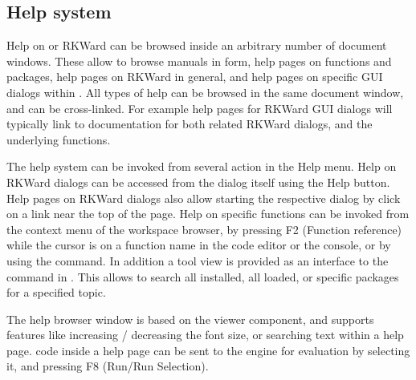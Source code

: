 \subsection{Help system}
\label{sec:help_system}
Help on 
or RKWard can be browsed inside an arbitrary number of document
windows. These allow to browse  manuals in
 form, help pages on
 functions and packages, help pages on
RKWard in general, and help pages on specific GUI dialogs within
. All types of help can be browsed in the
same document window, and can be cross-linked. For example help pages for
RKWard GUI dialogs will typically link to documentation for both
related RKWard dialogs, and the underlying
 functions.

The help system can be invoked from several action in the
Help menu. Help on RKWard dialogs can be
accessed from the dialog itself using the
Help button. Help pages on RKWard dialogs
also allow starting the respective dialog by click on a link near the
top of the page. Help on  specific
 functions can be invoked from the context
menu of the workspace browser, by pressing F2 (Function
reference) while the cursor is on a function name in the
code editor or the  console, or by using
the  
command. In addition a tool view is provided as an interface to the
 command in
. This allows to search all installed, all
loaded, or specific  packages for a
specified topic.

The help browser window is based on the 
 viewer component, and supports
features like increasing / decreasing the font size, or searching text
within a help page.  code inside a help
page can be sent to the  engine for
evaluation by selecting it, and pressing F8 (Run/Run
Selection).
